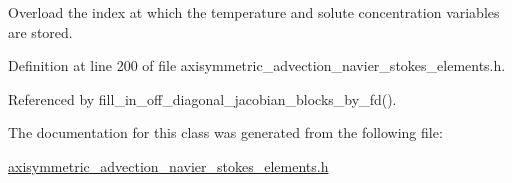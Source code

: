 Overload the index at which the temperature and solute concentration variables are stored. 



Definition at line 200 of file axisymmetric\+\_\+advection\+\_\+navier\+\_\+stokes\+\_\+elements.\+h.



Referenced by fill\+\_\+in\+\_\+off\+\_\+diagonal\+\_\+jacobian\+\_\+blocks\+\_\+by\+\_\+fd().



The documentation for this class was generated from the following file\+:\begin{DoxyCompactItemize}
\item 
\hyperlink{axisymmetric__advection__navier__stokes__elements_8h}{axisymmetric\+\_\+advection\+\_\+navier\+\_\+stokes\+\_\+elements.\+h}\end{DoxyCompactItemize}
